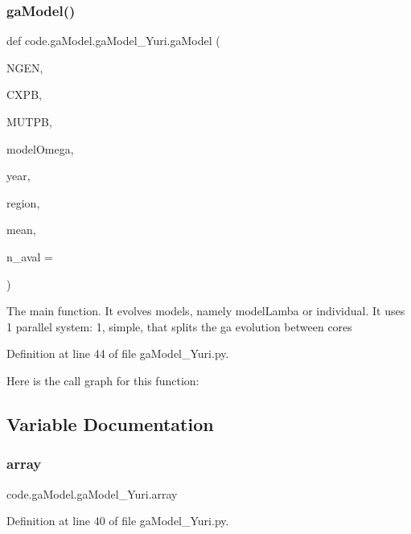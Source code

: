 \subsubsection{\texorpdfstring{ga\+Model()}{gaModel()}}
{\footnotesize\ttfamily def code.\+ga\+Model.\+ga\+Model\+\_\+\+Yuri.\+ga\+Model (\begin{DoxyParamCaption}\item[{}]{N\+G\+EN,  }\item[{}]{C\+X\+PB,  }\item[{}]{M\+U\+T\+PB,  }\item[{}]{model\+Omega,  }\item[{}]{year,  }\item[{}]{region,  }\item[{}]{mean,  }\item[{}]{n\+\_\+aval = {} }\end{DoxyParamCaption})}

\begin{DoxyVerb}The main function. It evolves models, namely modelLamba or individual. 
It uses 1 parallel system: 1, simple, that splits the ga evolution between cores
\end{DoxyVerb}
 

Definition at line 44 of file ga\+Model\+\_\+\+Yuri.\+py.

Here is the call graph for this function\+:


\subsection{Variable Documentation}
\mbox{\label{namespacecode_1_1ga_model_1_1ga_model___yuri_a479efbc9c9aa7dff9879559ce585a81c}} 
\subsubsection{\texorpdfstring{array}{array}}
{\footnotesize\ttfamily code.\+ga\+Model.\+ga\+Model\+\_\+\+Yuri.\+array}



Definition at line 40 of file ga\+Model\+\_\+\+Yuri.\+py.

\mbox{\label{namespacecode_1_1ga_model_1_1ga_model___yuri_a4487ad90b1629e57496b29d77a0bf9f0}} 
